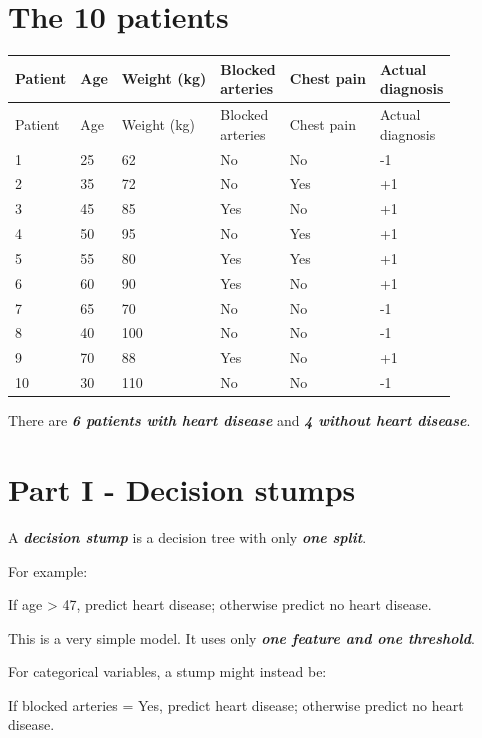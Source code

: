 \documentclass[10pt]{article}
\begin{document}
\section*{The 10 patients}
\begingroup
\small
\setlength{\tabcolsep}{4pt}
\begin{longtable}{l|l|l|l|l|l}
Patient & Age & Weight (kg) & \shortstack[l]{Blocked \\ arteries} & Chest pain & \shortstack[l]{Actual \\ diagnosis} \\[1.5pt]
\hline
\endfirsthead
Patient & Age & Weight (kg) & \shortstack[l]{Blocked \\ arteries} & Chest pain & \shortstack[l]{Actual \\ diagnosis} \\[1.5pt]
\hline
\endhead
1 & 25 & 62 & No & No & -1 \\[1.5pt]
2 & 35 & 72 & No & Yes & +1 \\[1.5pt]
3 & 45 & 85 & Yes & No & +1 \\[1.5pt]
4 & 50 & 95 & No & Yes & +1 \\[1.5pt]
5 & 55 & 80 & Yes & Yes & +1 \\[1.5pt]
6 & 60 & 90 & Yes & No & +1 \\[1.5pt]
7 & 65 & 70 & No & No & -1 \\[1.5pt]
8 & 40 & 100 & No & No & -1 \\[1.5pt]
9 & 70 & 88 & Yes & No & +1 \\[1.5pt]
10 & 30 & 110 & No & No & -1 \\[1.5pt]
\end{longtable}
\endgroup
There are \textbf{\textit{6 patients with heart disease}} and \textbf{\textit{4 without heart disease}}.

\clearpage
\section*{Part I - Decision stumps}
A \textbf{\textit{decision stump}} is a decision tree with only \textbf{\textit{one split}}.

For example:

If age > 47, predict heart disease; otherwise predict no heart disease.

This is a very simple model. It uses only \textbf{\textit{one feature and one threshold}}.

For categorical variables, a stump might instead be:

If blocked arteries = Yes, predict heart disease; otherwise predict no heart disease.
\end{document}
